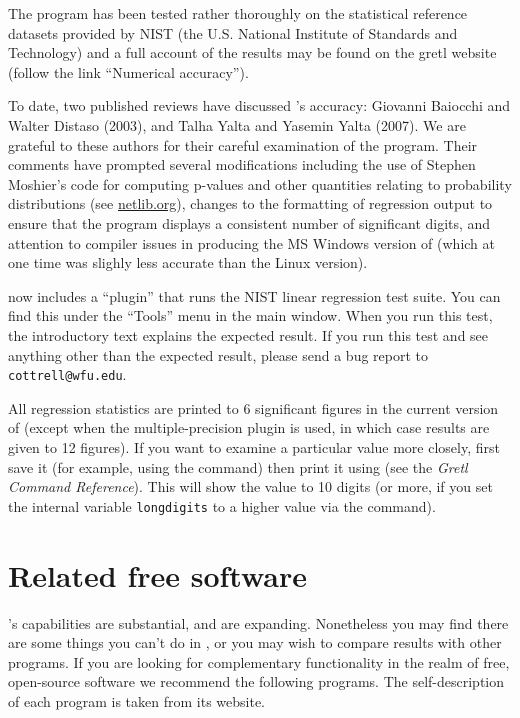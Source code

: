 The program has been tested rather thoroughly on the statistical
reference datasets provided by NIST (the U.S.  National Institute of
Standards and Technology) and a full account of the results may be
found on the gretl website (follow the link ``Numerical accuracy'').

To date, two published reviews have discussed 's accuracy:
Giovanni Baiocchi and Walter Distaso (2003), and Talha Yalta and
Yasemin Yalta (2007).  We are grateful to these authors for their
careful examination of the program.  Their comments have prompted
several modifications including the use of Stephen Moshier's
 code for computing p-values and other quantities relating
to probability distributions (see
\href{http://www.netlib.org/cephes/}{netlib.org}), changes to the
formatting of regression output to ensure that the program displays a
consistent number of significant digits, and attention to compiler
issues in producing the MS Windows version of  (which at
one time was slighly less accurate than the Linux version).

 now includes a ``plugin'' that runs the NIST linear
regression test suite.  You can find this under the ``Tools'' menu in
the main window.  When you run this test, the introductory text
explains the expected result.  If you run this test and see anything
other than the expected result, please send a bug report to
\verb+cottrell@wfu.edu+.

All regression statistics are printed to 6 significant figures in the
current version of  (except when the multiple-precision
plugin is used, in which case results are given to 12 figures).  If
you want to examine a particular value more closely, first save it
(for example, using the  command) then print it using
 (see the \emph{Gretl Command Reference}).  This
will show the value to 10 digits (or more, if you set the internal
variable \texttt{longdigits} to a higher value via the 
command).

\chapter{Related free software}
\label{app-advanced}

's capabilities are substantial, and are expanding.
Nonetheless you may find there are some things you can't do in
, or you may wish to compare results with other programs.
If you are looking for complementary functionality in the realm of
free, open-source software we recommend the following programs.  The
self-description of each program is taken from its website.

